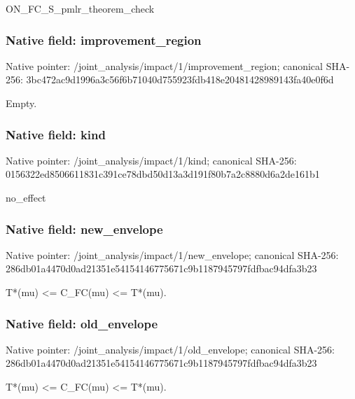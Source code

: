 \documentclass[10pt,a4paper]{article}
\begin{document}
\begingroup\raggedright\sloppy ON\_\allowbreak{}FC\_\allowbreak{}S\_\allowbreak{}pmlr\_\allowbreak{}theorem\_\allowbreak{}check\par\endgroup

\subsubsection{Native field: improvement\_\allowbreak{}region}
Native pointer: /joint\_\allowbreak{}analysis/impact/1/improvement\_\allowbreak{}region; canonical SHA-256: 3bc472ac9d1996a3c56f6b71040d755923fdb418e20481428989143fa40e0f6d

\begingroup\raggedright\sloppy Empty.\par\endgroup

\subsubsection{Native field: kind}
Native pointer: /joint\_\allowbreak{}analysis/impact/1/kind; canonical SHA-256: 0156322ed8506611831c391ce78dbd50d13a3d191f80b7a2c8880d6a2de161b1

\begingroup\raggedright\sloppy no\_\allowbreak{}effect\par\endgroup

\subsubsection{Native field: new\_\allowbreak{}envelope}
Native pointer: /joint\_\allowbreak{}analysis/impact/1/new\_\allowbreak{}envelope; canonical SHA-256: 286db01a4470d0ad21351e54154146775671c9b1187945797fdfbac94dfa3b23

\begingroup\raggedright\sloppy T*(mu) <=\allowbreak{} C\_\allowbreak{}FC(mu) <=\allowbreak{} T*(mu).\par\endgroup

\subsubsection{Native field: old\_\allowbreak{}envelope}
Native pointer: /joint\_\allowbreak{}analysis/impact/1/old\_\allowbreak{}envelope; canonical SHA-256: 286db01a4470d0ad21351e54154146775671c9b1187945797fdfbac94dfa3b23

\begingroup\raggedright\sloppy T*(mu) <=\allowbreak{} C\_\allowbreak{}FC(mu) <=\allowbreak{} T*(mu).\par\endgroup
\end{document}
